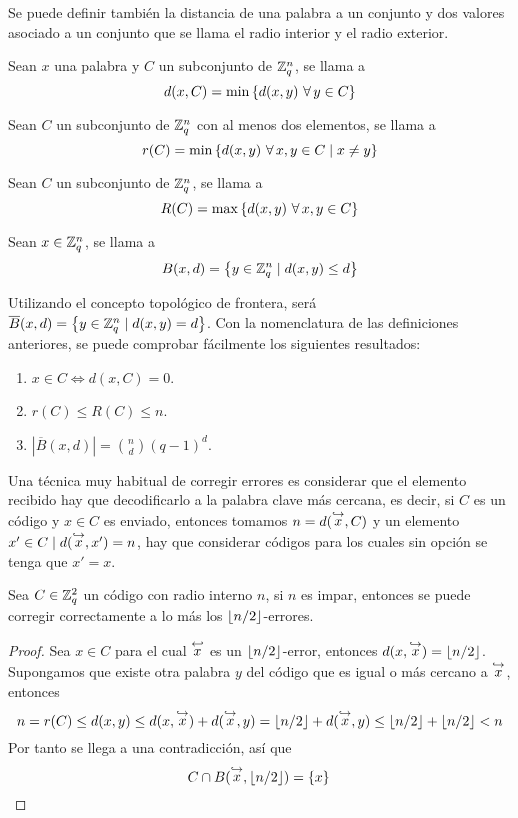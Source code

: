 Se puede definir también la distancia de una palabra a un conjunto y dos valores asociado a un conjunto que se llama el radio interior y el radio exterior.

\begin{definition}
	Sean $x$ una palabra y $C$ un subconjunto de $\mathbb{Z}_q^n$, se llama  a
	\[
		d(x, C) = \min\set{d(x,y)\ \forall y\in C}
	\]
\end{definition}

\begin{definition}
	Sean $C$ un subconjunto de $\mathbb{Z}_q^n$ con al menos dos elementos, se llama  a
	\[
		r(C) = \min\set{d(x,y)\ \forall x,y\in C\tq x\neq y}
	\]
\end{definition}

\begin{definition}
	Sean $C$ un subconjunto de $\mathbb{Z}_q^n$, se llama  a
	\[
		R(C) = \max\set{d(x,y)\ \forall x,y\in C}
	\]
\end{definition}

\begin{definition}
	Sean $x\in\mathbb{Z}_q^n$, se llama  a
	\[
		B(x, d) = \left\{y\in\mathbb{Z}_q^n \mid d(x,y)\leq d\right\}
	\]
\end{definition}

Utilizando el concepto topológico de frontera, será $\overline{B}(x, d) = \left\{y\in\mathbb{Z}_q^n \mid d(x,y)= d\right\}$.
Con la nomenclatura de las definiciones anteriores, se puede comprobar fácilmente los siguientes resultados:
\begin{enumerate}
	\item $x\in C \iff d(x, C) = 0$.
	\item $r(C)\leq R(C) \leq n$.
	\item $|\overline{B}(x, d)| = \binom{n}{d}(q-1)^d$.
\end{enumerate}

Una técnica muy habitual de corregir errores es considerar que el elemento recibido hay que decodificarlo a la palabra clave más cercana, es decir, si $C$ es un código y $x\in C$ es enviado, entonces tomamos $n=d(\stackrel{\hookrightarrow}{x}, C)$ y un elemento $x'\in C\mid d(\stackrel{\hookrightarrow}{x}, x')=n$, hay que considerar códigos para los cuales sin opción se tenga que $x'=x$.

\begin{lemma}
	Sea $C\in\mathbb{Z}_q^2$ un código con radio interno $n$, si $n$ es impar, entonces se puede corregir correctamente a lo más los $\lfloor n/2 \rfloor$-errores.
\end{lemma}
\begin{proof}
	Sea $x\in C$ para el cual $\stackrel{\hookleftarrow}{x}$ es un $\lfloor n/2 \rfloor$-error, entonces $d(x, \stackrel{\hookrightarrow}{x})=\lfloor n/2 \rfloor$.
	Supongamos que existe otra palabra $y$ del código que es igual o más cercano a $\stackrel{\hookrightarrow}{x}$, entonces
	\[
		n = r(C) \leq d(x, y) \leq d(x, \stackrel{\hookrightarrow}{x}) + d(\stackrel{\hookrightarrow}{x}, y) = \lfloor n/2 \rfloor + d(\stackrel{\hookrightarrow}{x}, y) \leq \lfloor n/2 \rfloor + \lfloor n/2 \rfloor < n
	\]
	Por tanto se llega a una contradicción, así que
	\[
		C\cap B(\stackrel{\hookrightarrow}{x}, \lfloor n/2 \rfloor) = \left\{x\right\}\qedhere
	\]
\end{proof}

